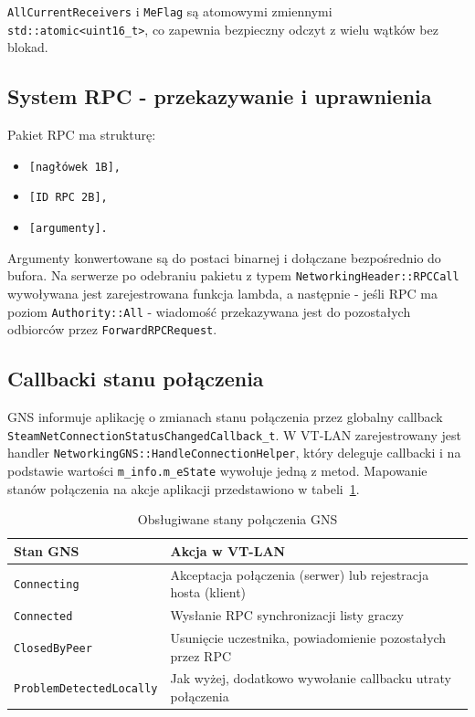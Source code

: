\texttt{AllCurrentReceivers} i \texttt{MeFlag} są atomowymi zmiennymi
\texttt{std::atomic<uint16\_t>}, co zapewnia bezpieczny odczyt z wielu
wątków bez blokad.

\subsection*{System RPC - przekazywanie i uprawnienia}

Pakiet RPC ma strukturę:
\begin{itemize}
	\item \texttt{[nagłówek 1B],}
	\item \texttt{[ID RPC 2B],}
	\item \texttt{[argumenty].}
\end{itemize} 
Argumenty konwertowane są do postaci binarnej i dołączane bezpośrednio do bufora.
Na serwerze po odebraniu pakietu z typem \texttt{NetworkingHeader::RPCCall}
wywoływana jest zarejestrowana funkcja lambda, a następnie - jeśli RPC ma poziom
\texttt{Authority::All} - wiadomość przekazywana jest do pozostałych
odbiorców przez \texttt{ForwardRPCRequest}.

\subsection*{Callbacki stanu połączenia}

GNS informuje aplikację o zmianach stanu połączenia przez
globalny callback\\ \texttt{SteamNetConnectionStatusChangedCallback\_t}.
W VT-LAN zarejestrowany jest handler
\texttt{NetworkingGNS::HandleConnectionHelper}, który deleguje
callbacki i na podstawie
wartości \texttt{m\_info.m\_eState}
wywołuje jedną z metod. Mapowanie stanów połączenia na akcje aplikacji
przedstawiono w tabeli~\ref{tab:gns_states}.

\begin{table}[H]
    \centering
    \caption{Obsługiwane stany połączenia GNS}
    \begin{tabularx}{\textwidth}{|l|X|}
        \hline
        \textbf{Stan GNS} & \textbf{Akcja w VT-LAN} \\
        \hline
        \texttt{Connecting} & Akceptacja połączenia (serwer) lub rejestracja hosta (klient) \\
        \hline
        \texttt{Connected} & Wysłanie RPC synchronizacji listy graczy \\
        \hline
        \texttt{ClosedByPeer} & Usunięcie uczestnika, powiadomienie pozostałych przez RPC \\
        \hline
        \texttt{ProblemDetectedLocally} & Jak wyżej, dodatkowo wywołanie callbacku utraty połączenia \\
        \hline
    \end{tabularx}
    \label{tab:gns_states}
\end{table}


